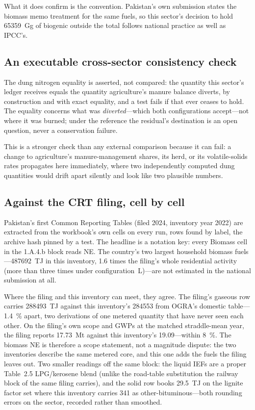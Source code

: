 What it does confirm is the convention. Pakistan's own submission states the biomass memo
treatment for the same fuels, so this sector's decision to hold \SI{65359}{\giga\gram} of
biogenic \COtwo{} outside the total follows national practice as well as IPCC's.

\subsection{An executable cross-sector consistency check}

The dung nitrogen equality is asserted, not compared: the quantity this sector's ledger
receives equals the quantity agriculture's manure balance diverts, by construction and
with exact equality, and a test fails if that ever ceases to hold. The equality concerns
what was \emph{diverted}---which both configurations accept---not where it was burned;
under the reference the residual's destination is an open question,
never a conservation failure.

This is a stronger check than any external comparison because it can fail: a change to
agriculture's manure-management shares, its herd, or its volatile-solids rates
propagates here immediately, where two independently computed dung quantities would
drift apart silently and look like two plausible numbers.

\subsection{Against the CRT filing, cell by cell}

Pakistan's first Common Reporting Tables (filed 2024, inventory year 2022) are extracted from
the workbook's own cells on every run, rows found by label, the archive hash pinned by a test.
The headline is a notation key: every Biomass cell in the 1.A.4.b block reads NE. The
country's two largest household biomass fuels---\SI{487692}{\tera\joule} in this inventory,
\num{1.6} times the filing's whole residential activity (more
than three times under configuration~L)---are not estimated in the national
submission at all.

Where the filing and this inventory can meet, they agree. The filing's gaseous row carries
\SI{288493}{\tera\joule} against this inventory's \SI{284553}{} from OGRA's domestic
table---\SI{1.4}{\percent} apart, two derivations of one metered quantity that have never
seen each other. On the filing's own scope and GWPs at the matched straddle-mean year, the
filing reports \SI{17.73}{\mega\tonne} against this inventory's \SI{19.09}{}---within
\SI{8}{\percent}. The biomass NE is therefore a scope statement, not a magnitude dispute:
the two inventories describe the same metered core, and this one adds the fuels the filing
leaves out. Two smaller readings off the same block: the liquid IEFs are a proper
Table~2.5 LPG/kerosene blend (unlike the road-table substitution the railway block of the
same filing carries), and the solid row books \SI{29.5}{\tera\joule} on the lignite factor
set where this inventory carries \SI{341}{} as other-bituminous---both rounding errors on
the sector, recorded rather than smoothed.

